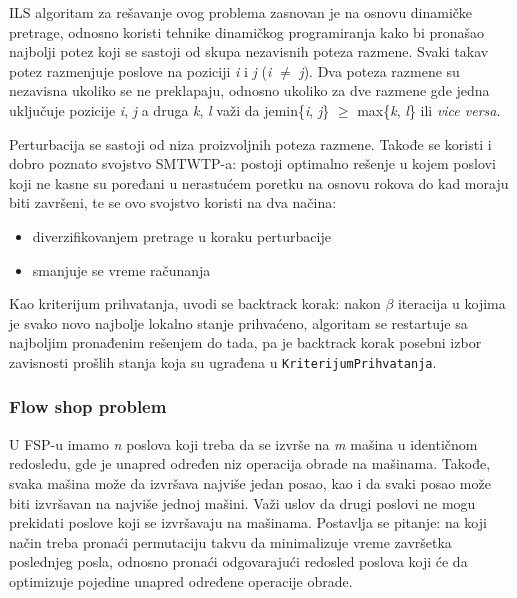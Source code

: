 \documentclass[a4paper]{article}
\newcommand{\kriterijum}[0]{\small{\texttt{KriterijumPrihvatanja}}}
\begin{document}
ILS algoritam za rešavanje ovog problema zasnovan je na osnovu dinamičke pretrage, odnosno koristi tehnike dinamičkog programiranja kako bi pronašao najbolji potez koji se sastoji od skupa nezavisnih poteza razmene. Svaki takav potez razmenjuje poslove na poziciji \textit{i} i \textit{j} (\textit{i} $\ne$ \textit{j}). Dva poteza razmene su nezavisna ukoliko se ne preklapaju, odnosno ukoliko za dve razmene gde jedna uključuje pozicije \textit{i}, \textit{j} a druga \textit{k}, \textit{l} važi da je\linebreak min\{\textit{i}, \textit{j}\} $\geq$ max\{\textit{k}, \textit{l}\} ili \textit{vice versa}.

Perturbacija se sastoji od niza proizvoljnih poteza razmene. Takođe se koristi i dobro poznato svojstvo SMTWTP-a: postoji optimalno rešenje u kojem poslovi koji ne kasne su poređani u nerastućem poretku na osnovu rokova do kad moraju biti završeni, te se ovo svojstvo koristi na dva načina:
\begin{itemize}
  \item diverzifikovanjem pretrage u koraku perturbacije
  \item smanjuje se vreme računanja
\end{itemize}
Kao kriterijum prihvatanja, uvodi se backtrack korak: nakon $\beta$ iteracija u kojima je svako novo najbolje lokalno stanje prihvaćeno, algoritam se restartuje sa najboljim pronađenim rešenjem do tada, pa je backtrack korak posebni izbor zavisnosti prošlih stanja koja su ugrađena u \kriterijum. \cite{designOfIteratedLocalSearchAlgorithms}

\subsubsection{Flow shop problem}
U FSP-u imamo \textit{n} poslova koji treba da se izvrše na \textit{m} mašina u identičnom redosledu, gde je unapred određen niz operacija obrade na mašinama. Takođe, svaka mašina može da izvršava najviše jedan posao, kao i da svaki posao može biti izvršavan na najviše jednoj mašini. Važi uslov da drugi poslovi ne mogu prekidati poslove koji se izvršavaju na mašinama.  Postavlja se pitanje: na koji način treba pronaći permutaciju takvu da minimalizuje
vreme završetka poslednjeg posla, odnosno pronaći odgovarajući redosled poslova koji će da optimizuje pojedine unapred određene operacije obrade.\cite{handbookOfMetaheuristics}
\end{document}

